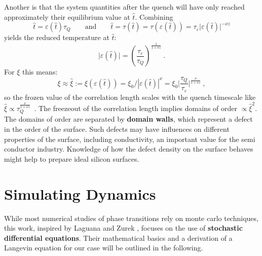 	Another is that the system quantities after the quench will have only reached approximately their equilibrium value at $\hat{t}$. Combining
	\begin{equation}
		\hat{t} =	\varepsilon(\hat{t}) \tau_Q \qquad \text{and} \qquad  \hat{t} =	\tau(\hat{t}) = \tau(\varepsilon(\hat{t})) =	\tau_\varepsilon \big | \varepsilon(\hat{t}) \big |^{-\nu z}
	\end{equation} 
	yields the reduced temperature at $\hat{t}$:
	\begin{equation}
		\big|\varepsilon (\hat{t}) \big| =	\left(\frac{\tau_\varepsilon}{\tau_Q} \right)^{\frac{1}{1 + \nu z}} ~.
	\end{equation}
	For $\xi$ this means:
	\begin{equation} \label{Eq::KZM-scaling}
		\xi \approx \hat{\xi} := \xi(\varepsilon(\hat{t})) =	\xi_0 / |\varepsilon(\hat{t})|^{\nu} =	\xi_0 \bigg| \frac{\tau_Q}{\tau_\varepsilon} \bigg |^{\frac{\nu}{1 + \nu z}} ~,
	\end{equation}
	so the frozen value of the correlation length scales with the quench timescale like $\hat{\xi} \propto \tau_Q^{\frac{\nu}{1 + \nu z}}$~.
	The freezeout of the correlation length implies domains of order $\propto \hat{\xi}^2$. The domains of order are separated by \textbf{domain walls}, which represent a defect in the order of the surface. Such defects may have influences on different properties of the surface, including conductivity, an important value for the semi conductor industry. Knowledge of how the defect density on the surface behaves might help to prepare ideal silicon surfaces.  
	\chapter{Simulating Dynamics}
	While most numerical studies of phase transitions rely on monte carlo techniques, this work, inspired by Laguana and Zurek \cite{laguna1997density}, focuses on the use of \textbf{stochastic differential equations}. Their mathematical basics and a derivation of a Langevin equation for our case  will be outlined in the following.
